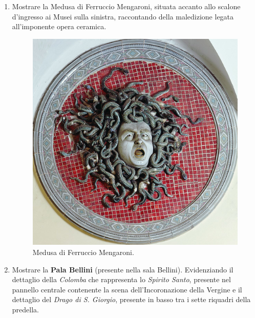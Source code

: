 \documentclass[12pt,a4paper]{article}
\begin{document}
	\begin{enumerate}
		
	\item 	Mostrare la Medusa di Ferruccio Mengaroni, situata accanto allo scalone d'ingresso ai Musei sulla sinistra, raccontando della maledizione legata all'imponente opera ceramica.
	\begin{figure}[h]
		\centering
		\includegraphics[]{Medusa.jpg}
		\caption{Medusa di Ferruccio Mengaroni.}
	\end{figure}
	
	\item Mostrare la \textbf{Pala Bellini} (presente nella sala Bellini). Evidenziando il dettaglio della \textit{Colomba} che rappresenta lo \textit{Spirito Santo}, presente nel pannello centrale contenente la scena dell'Incoronazione della Vergine e il dettaglio del \textit{Drago di S. Giorgio}, presente in basso tra i sette riquadri della predella.
	

\end{enumerate}
\end{document}
